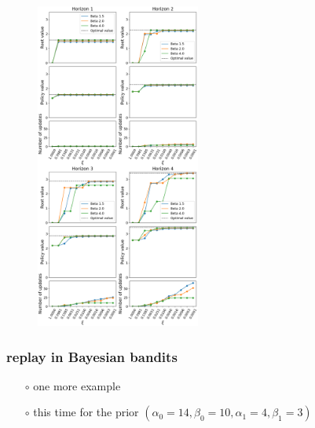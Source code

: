 \documentclass[aspectratio=169]{beamer}
\begin{document}
\begin{landscape}
    \begin{frame}
        \begin{figure}
            \includegraphics[width=0.48\textwidth]{trees/1/alpha05_beta01_alpha12_beta14_complete.png}
        \end{figure}
    \end{frame}
\end{landscape}

\begin{frame}
    \frametitle{replay in Bayesian bandits}
    \begin{itemize}
        \item[$\circ$] one more example
        \item[$\circ$] this time for the prior $(\alpha_0=14, \beta_0=10, \alpha_1=4, \beta_1=3)$ 
    \end{itemize}
\end{frame}
\end{document}
